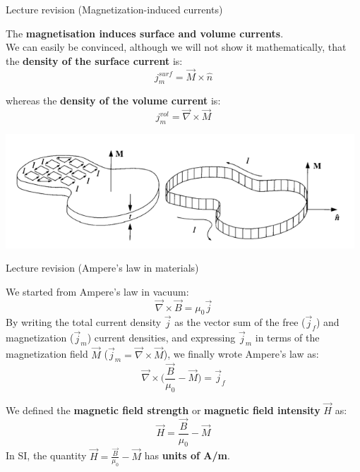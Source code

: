 %
%
%

\begin{frame}{Lecture \summarizedlecture revision (Magnetization-induced currents)}

The {\bf magnetisation induces surface and volume currents}.\\
\vspace{0.3cm}
We can easily be convinced, although we will not show it mathematically,
that the {\bf density of the surface current} is:
\begin{equation*}
  j_{m}^{surf} = \vec{M} \times \hat{n}
\end{equation*}

\vspace{0.1cm}

whereas the {\bf density of the volume current} is:
\begin{equation*}
  j_{m}^{vol} = \vec{\nabla} \times \vec{M}
\end{equation*}

\begin{center}
  \includegraphics[width=0.98\textwidth]{./images/schematics/magnetization_currents_01.png}\\
\end{center}

\end{frame}

%
%
%

\begin{frame}{Lecture \summarizedlecture revision (Ampere's law in materials)}

We started from Ampere's law in vacuum:
\begin{equation*}
  \vec{\nabla} \times \vec{B} = \mu_0 \vec{j}
\end{equation*}
By writing the total current density $\vec{j}$ as the vector sum of the free ($\vec{j}_{f}$)
and magnetization ($\vec{j}_{m}$) current densities,
and expressing $\vec{j}_{m}$ in terms of the
magnetization field $\vec{M}$ ($\displaystyle \vec{j}_{m} = \vec{\nabla} \times \vec{M}$),
we finally wrote Ampere's law as:
\begin{equation*}
  \vec{\nabla} \times \Big( \frac{\vec{B}}{\mu_0} - \vec{M} \Big) = \vec{j}_{f}
\end{equation*}

We defined the {\bf magnetic field strength} or {\bf magnetic field intensity} $\vec{H}$ as:
\begin{equation*}
  \vec{H} = \frac{\vec{B}}{\mu_0} - \vec{M}
\end{equation*}
In SI, the quantity $\displaystyle \vec{H} = \frac{\vec{B}}{\mu_0} - \vec{M}$ has {\bf units of A/m}.\\

\end{frame}

